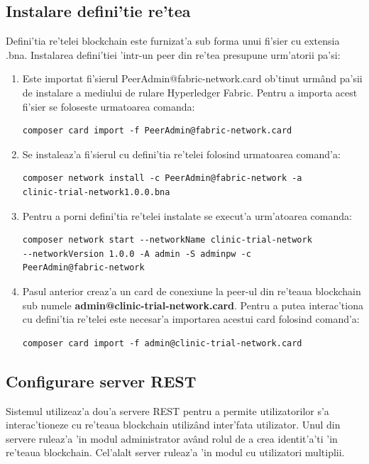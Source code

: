 \documentclass[12pt,a4paper,twoside]{report}
\begin{document}
\subsection{Instalare defini'tie re'tea}

Defini'tia re'telei blockchain este furnizat'a sub forma unui fi'sier cu extensia .bna. Instalarea defini'tiei 'intr-un peer din re'tea presupune urm'atorii pa'si:
    \begin{enumerate}
        \item Este importat fi'sierul PeerAdmin@fabric-network.card ob'tinut urm\^and pa'sii de instalare a mediului de rulare Hyperledger Fabric. Pentru a importa acest fi'sier se foloseste urmatoarea comanda:
        \begin{lstlisting}[backgroundcolor=\color{light-gray}]
composer card import -f PeerAdmin@fabric-network.card
            \end{lstlisting}
        \item Se instaleaz'a fi'sierul cu defini'tia re'telei folosind urmatoarea comand'a:
        \begin{lstlisting}[backgroundcolor=\color{light-gray}]
composer network install -c PeerAdmin@fabric-network -a 
clinic-trial-network1.0.0.bna
        \end{lstlisting}
        \item Pentru a porni defini'tia re'telei instalate se execut'a urm'atoarea comanda:
         \begin{lstlisting}[backgroundcolor=\color{light-gray}]
composer network start --networkName clinic-trial-network 
--networkVersion 1.0.0 -A admin -S adminpw -c 
PeerAdmin@fabric-network
        \end{lstlisting}
        \item Pasul anterior creaz'a un card de conexiune la peer-ul din re'teaua blockchain sub numele \textbf{admin@clinic-trial-network.card}. Pentru a putea interac'tiona cu defini'tia re'telei este necesar'a importarea acestui card folosind comand'a:
         \begin{lstlisting}[backgroundcolor=\color{light-gray}]
composer card import -f admin@clinic-trial-network.card
        \end{lstlisting}
    \end{enumerate}

\subsection{Configurare server REST}
Sistemul utilizeaz'a dou'a servere REST pentru a permite utilizatorilor s'a interac'tioneze cu re'teaua blockchain utiliz\^and inter'fata utilizator. Unul din servere ruleaz'a 'in modul administrator av\^and rolul de a crea identit'a'ti 'in re'teaua blockchain. Cel'alalt server ruleaz'a 'in modul cu utilizatori multiplii.
\end{document}
